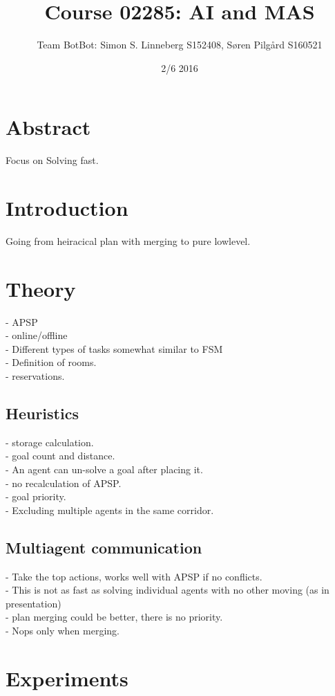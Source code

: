 \documentclass{article}
\title{Course 02285: AI and MAS}
\author{Team BotBot: Simon S. Linneberg S152408, Søren Pilgård S160521}
\date{2/6 2016}
\begin{document}
\maketitle

\section{Abstract}
Focus on Solving fast.\\
\section{Introduction}
Going from heiracical plan with merging to pure lowlevel.\\

\section{Theory}
- APSP\\
- online/offline\\
- Different types of tasks somewhat similar to FSM\\
- Definition of rooms.\\
- reservations.\\
\subsection{Heuristics}
- storage calculation.\\
- goal count and distance.\\
- An agent can un-solve a goal after placing it.\\
- no recalculation of APSP.\\
- goal priority.\\
- Excluding multiple agents in the same corridor.\\ 
\subsection{Multiagent communication}
- Take the top actions, works well with APSP if no conflicts.\\
- This is not as fast as solving individual agents with no other moving (as in presentation)\\
- plan merging could be better, there is no priority.\\
- Nops only when merging.\\
\section{Experiments}
\end{document}
